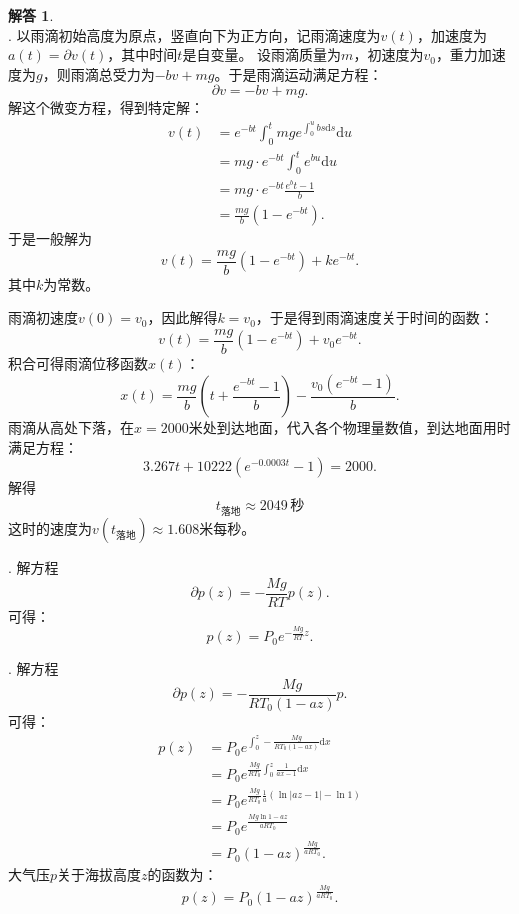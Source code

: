 \documentclass[12pt,UTF8]{ctexbook}
\theoremstyle{definition}
\newtheorem*{so}{解答}
\theoremstyle{plain}
\begin{document}
\begin{so}
    \mbox{} \\
    . 以雨滴初始高度为原点，竖直向下为正方向，记雨滴速度为$v(t)$，加速度为$a(t) = \partial v (t)$，其中时间$t$是自变量。
    设雨滴质量为$m$，初速度为$v_0$，重力加速度为$g$，则雨滴总受力为$- bv + mg$。于是雨滴运动满足方程：
    $$ \partial v = - bv + mg.$$
    解这个微变方程，得到特定解：
    \begin{align*}
        v(t) &= e^{-bt} \int_0^t mg e^{\int_0^u bs\mathrm{d}s} \mathrm{d}u\\
        &= mg \cdot e^{-bt} \int_0^t e^{bu}\mathrm{d}u \\
        &= mg \cdot e^{-bt} \frac{e^bt - 1}{b} \\
        &= \frac{mg}{b}\left(1 - e^{-bt}\right).
    \end{align*}
    于是一般解为
    $$ v(t) = \frac{mg}{b}\left(1 - e^{-bt}\right) + ke^{-bt}. $$
    其中$k$为常数。
    
    雨滴初速度$v(0) = v_0$，因此解得$k = v_0$，于是得到雨滴速度关于时间的函数：
    $$ v(t) = \frac{mg}{b}\left(1 - e^{-bt}\right) + v_0e^{-bt}. $$
    积合可得雨滴位移函数$x(t)$：
    $$ x(t) = \frac{mg}{b}\left(t + \frac{e^{-bt} - 1}{b}\right) - \frac{v_0\left(e^{-bt} - 1\right)}{b}. $$
    雨滴从高处下落，在$x=2000$米处到达地面，代入各个物理量数值，到达地面用时满足方程：
    $$ 3.267t + 10222 \left(e^{-0.0003t} - 1\right) = 2000.  $$
    解得
    $$ t_{\text{落地}} \approx 2049\,\mbox{秒} $$
    这时的速度为$v(t_{\text{落地}}) \approx 1.608$米每秒。

    . 解方程
    $$ \partial p(z) = -\frac{Mg}{RT} p(z). $$
    可得：
    $$ p(z) = P_0e^{-\frac{Mg}{RT}z}.$$

    . 解方程
    $$ \partial p(z) = -\frac{Mg}{RT_0(1 - az)} p. $$
    可得：
    \begin{align*}
        p(z) &= P_0e^{\int_0^z -\frac{Mg}{RT_0(1 - ax)}\mathrm{d}x} \\
        &= P_0e^{\frac{Mg}{RT_0}\int_0^z \frac{1}{ax - 1}\mathrm{d}x} \\
        &= P_0e^{\frac{Mg}{RT_0}\frac{1}{a}\left(\ln{|az - 1|} - \ln{1}\right)} \\
        &= P_0e^{\frac{Mg\ln{1 - az}}{aRT_0}} \\
        &= P_0 (1 - az)^{\frac{Mg}{aRT_0}}.
    \end{align*}
    大气压$p$关于海拔高度$z$的函数为：
    $$ p(z) = P_0 (1 - az)^{\frac{Mg}{aRT_0}}.$$


\end{so}
\end{document}
